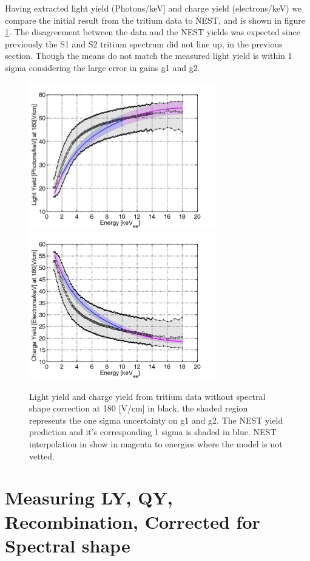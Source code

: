 Having extracted light yield (Photons/keV] and charge yield (electrons/keV) we compare the initial result from the tritium data to NEST, and is shown in figure \ref{fig:LYQY_0}. The disagreement between the data and the NEST yields was expected since previously the S1 and S2 tritium spectrum did not line up, in the previous section. Though the means do not match the measured light yield is within 1 sigma considering the large error in gains g1 and g2.

 \begin{figure}[h!]\centering
\includegraphics[width=82mm]{Recombination_LY_QY/Figures/LYQY/LY_180_1sigBand_.png}
\includegraphics[width=82mm]{Recombination_LY_QY/Figures/LYQY/QY_180_1sigBand_.png}
\caption{Light yield and charge yield from tritium data without spectral shape correction at 180 [V/cm] in black, the shaded region represents the one sigma uncertainty on g1 and g2. The NEST yield prediction and it's corresponding 1 sigma is shaded in blue. NEST interpolation in show in magenta to energies where the model is not vetted. }
\label{fig:LYQY_0}
\end{figure}


\newpage

\section{Measuring LY, QY, Recombination, Corrected for Spectral shape}

